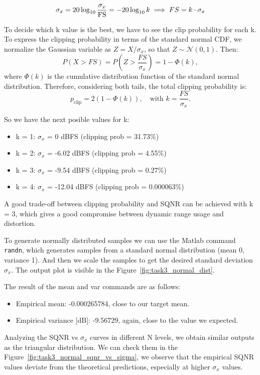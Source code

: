 \documentclass[11pt,a4paper]{article}
\begin{document}
\[
    \sigma_x = 20\log_{10}\frac{\sigma_x}{\rm FS} = -20\log_{10}{k} \implies FS = k \cdot \sigma_x
\]

To decide which k value is the best, we have to see the clip probability for each k.
To express the clipping probability in terms of the standard normal CDF, we normalize the Gaussian variable as $Z = X / \sigma_x$, so that $Z \sim \mathcal{N}(0,1)$. Then:
\[
    P(X > FS) = P\!\left(Z > \frac{FS}{\sigma_x}\right) = 1 - \Phi\!\left(k\right),
\]
where $\Phi(k)$ is the cumulative distribution function of the standard normal distribution. Therefore, considering both tails, the total clipping probability is:
\[
    p_{\text{clip}} = 2(1 - \Phi(k)), \quad \text{with } k = \frac{FS}{\sigma_x}.
\]

So we have the next posible values for k:

\begin{itemize}
    \item k = 1: $\sigma_x$ = 0 dBFS (clipping prob = 31.73\%)
    \item k = 2: $\sigma_x$ = -6.02 dBFS (clipping prob = 4.55\%)
    \item k = 3: $\sigma_x$ = -9.54 dBFS (clipping prob = 0.27\%)
    \item k = 4: $\sigma_x$ = -12.04 dBFS (clipping prob = 0.000063\%)
\end{itemize}

A good trade-off between clipping probability and SQNR can be achieved with k = 3, which gives a good compromise between dynamic range usage and distortion.

To generate normally distributed samples we can use the Matlab command \texttt{randn}, which generates samples from a standard normal distribution (mean 0, variance 1).
And then we scale the samples to get the desired standard deviation $\sigma_x$. The output plot is visible in the Figure~\ref{fig:task3_normal_dist}.

The result of the mean and var commands are as follows:
\begin{itemize}
    \item Empirical mean: -0.000265784, close to our target mean.
    \item Empirical variance [dB]: -9.56729, again, close to the value we expected.
\end{itemize}

Analyzing the SQNR vs $\sigma_x$ curves in different N levels, we obtain similar outputs as the triangular distribution.
We can check them in the Figure~\ref{fig:task3_normal_sqnr_vs_sigma}, we observe that the empirical SQNR values deviate from the theoretical predictions, especially at higher $\sigma_x$ values.
\end{document}
